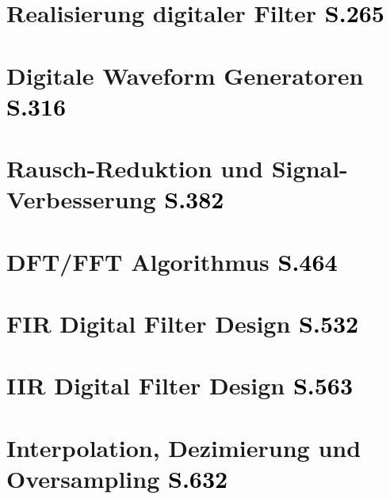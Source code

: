 \chapter{Realisierung digitaler Filter \textcolor{black}{\small S.265}}


\chapter{Digitale Waveform Generatoren \textcolor{black}{\small S.316}}


\chapter{Rausch-Reduktion und Signal-Verbesserung \textcolor{black}{\small S.382}}


\chapter{DFT/FFT Algorithmus \textcolor{black}{\small S.464}}


\chapter{FIR Digital Filter Design \textcolor{black}{\small S.532}}


\chapter{IIR Digital Filter Design \textcolor{black}{\small S.563}}


\chapter{Interpolation, Dezimierung und Oversampling \textcolor{black}{\small S.632}}


